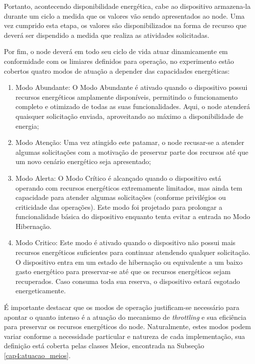Portanto, acontecendo disponibilidade energética, cabe ao dispositivo armazena-la durante um ciclo a medida que os valores vão sendo apresentados ao node. Uma vez cumprido esta etapa, os valores são disponibilizados na forma de recurso que deverá ser dispendido a medida que realiza as atividades solicitadas.

Por fim, o node deverá em todo seu ciclo de vida atuar dinamicamente em conformidade com os limiares definidos para operação, no experimento estão cobertos quatro modos de atuação a depender das capacidades energéticas:

\begin{enumerate}	
\item Modo Abundante: O Modo Abundante é ativado quando o dispositivo possui recursos energéticos amplamente disponíveis, permitindo o funcionamento completo e otimizado de todas as suas funcionalidades. Aqui, o node atenderá quaisquer solicitação enviada, aproveitando ao máximo a disponibilidade de energia;
\item Modo Atenção: Uma vez atingido este patamar, o node recusar-se a atender algumas solicitações com a motivação de preservar parte dos recursos até que um novo cenário energético seja apresentado;
\item Modo Alerta: O Modo Crítico é alcançado quando o dispositivo está operando com recursos energéticos extremamente limitados, mas ainda tem capacidade para atender algumas solicitações (conforme privilégios ou criticidade das operações). Este modo foi projetado para prolongar a funcionalidade básica do dispositivo enquanto tenta evitar a entrada no Modo Hibernação. 
\item Modo Critico: Este modo é ativado quando o dispositivo não possui mais recursos energéticos suficientes para continuar atendendo qualquer solicitação. O dispositivo entra em um estado de hibernação ou equivalente a um baixo gasto energético para preservar-se até que os recursos energéticos sejam recuperados. Caso consuma toda sua reserva, o dispositivo estará esgotado energeticamente.
\end{enumerate}

É importante destacar que os modos de operação justificam-se necessário para apontar o quanto intenso é a atuação do mecanismo de \textit{throttling} e sua eficiência para preservar os recursos energéticos do node. Naturalmente, estes modos podem variar conforme a necessidade particular e natureza de cada implementação, sua definição está coberta pelas classes Meios, encontrada na Subseção \ref{cap4:atuacao_meios}.




